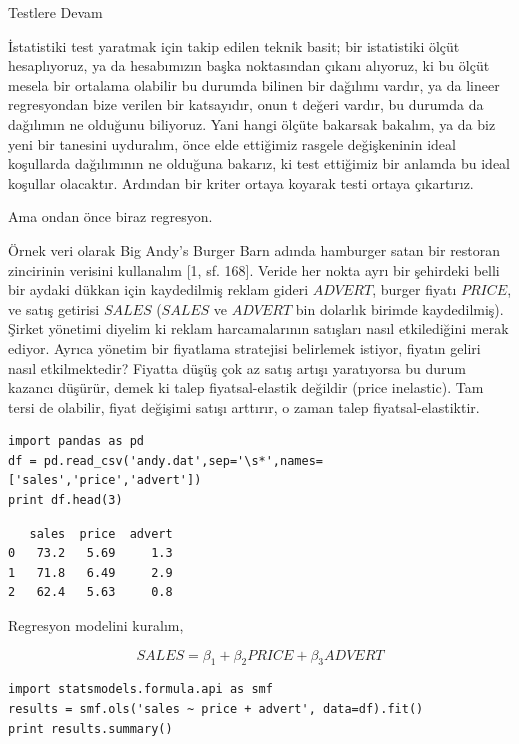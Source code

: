 \documentclass[12pt,fleqn]{article}\usepackage{../../common}
\begin{document}
Testlere Devam 

İstatistiki test yaratmak için takip edilen teknik basit; bir istatistiki
ölçüt hesaplıyoruz, ya da hesabımızın başka noktasından çıkanı alıyoruz, ki
bu ölçüt mesela bir ortalama olabilir bu durumda bilinen bir dağılımı
vardır, ya da lineer regresyondan bize verilen bir katsayıdır, onun t
değeri vardır, bu durumda da dağılımın ne olduğunu biliyoruz. Yani hangi
ölçüte bakarsak bakalım, ya da biz yeni bir tanesini uyduralım, önce elde
ettiğimiz rasgele değişkeninin ideal koşullarda dağılımının ne olduğuna
bakarız, ki test ettiğimiz bir anlamda bu ideal koşullar
olacaktır. Ardından bir kriter ortaya koyarak testi ortaya çıkartırız.

Ama ondan önce biraz regresyon.

Örnek veri olarak Big Andy's Burger Barn adında hamburger satan bir
restoran zincirinin verisini kullanalım [1, sf. 168]. Veride her nokta ayrı
bir şehirdeki belli bir aydaki dükkan için kaydedilmiş reklam gideri
$ADVERT$, burger fiyatı $PRICE$, ve satış getirisi $SALES$ ($SALES$ ve
$ADVERT$ bin dolarlık birimde kaydedilmiş). Şirket yönetimi diyelim ki
reklam harcamalarının satışları nasıl etkilediğini merak ediyor. Ayrıca
yönetim bir fiyatlama stratejisi belirlemek istiyor, fiyatın geliri nasıl
etkilmektedir? Fiyatta düşüş çok az satış artışı yaratıyorsa bu durum
kazancı düşürür, demek ki talep fiyatsal-elastik değildir (price
inelastic). Tam tersi de olabilir, fiyat değişimi satışı arttırır, o zaman
talep fiyatsal-elastiktir.

\begin{verbatim}
import pandas as pd
df = pd.read_csv('andy.dat',sep='\s*',names=['sales','price','advert'])
print df.head(3)
\end{verbatim}

\begin{verbatim}
   sales  price  advert
0   73.2   5.69     1.3
1   71.8   6.49     2.9
2   62.4   5.63     0.8
\end{verbatim}

Regresyon modelini kuralım,

$$ SALES = \beta_1 + \beta_2 PRICE + \beta_3 ADVERT $$

\begin{verbatim}
import statsmodels.formula.api as smf
results = smf.ols('sales ~ price + advert', data=df).fit()
print results.summary()
\end{verbatim}
\end{document}
